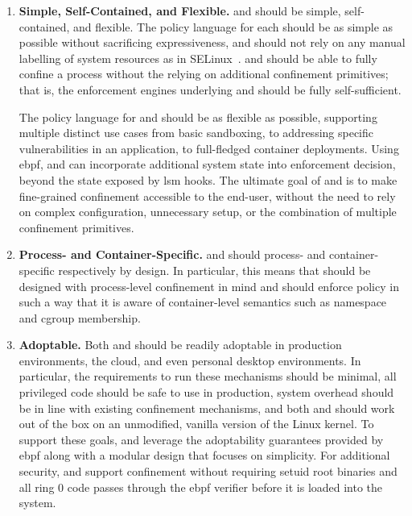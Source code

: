 \begin{enumerate}[font=\bfseries]
  \item \textbf{Simple, Self-Contained, and Flexible.}
    \bpfbox{} and \bpfcontain{} should be simple, self-contained, and flexible.  The
    policy language for each should be as simple as possible without sacrificing
    expressiveness, and should not rely on any manual labelling of system resources as in
    SELinux~\cite{smalley2001_selinux}. \bpfbox{} and \bpfcontain{} should be able to
    fully confine a process without the relying on additional confinement primitives; that
    is, the enforcement engines underlying \bpfbox{} and \bpfcontain{} should be fully
    self-sufficient.

    The policy language for \bpfbox{} and \bpfcontain{} should be as flexible as possible,
    supporting multiple distinct use cases from basic sandboxing, to addressing specific
    vulnerabilities in an application, to full-fledged container deployments. Using
    \gls{ebpf}, \bpfbox{} and \bpfcontain{} can incorporate additional system state into
    enforcement decision, beyond the state exposed by \gls{lsm} hooks. The ultimate goal
    of \bpfbox{} and \bpfcontain{} is to make fine-grained confinement accessible to the
    end-user, without the need to rely on complex configuration, unnecessary setup, or the
    combination of multiple confinement primitives.

  \item \textbf{Process- and Container-Specific.}
    \bpfbox{} and \bpfcontain{} should process- and container-specific respectively by
    design. In particular, this means that \bpfbox{} should be designed with process-level
    confinement in mind and \bpfcontain{} should enforce policy in such a way that it is
    aware of container-level semantics such as namespace and cgroup membership.

  \item \textbf{Adoptable.}
    Both \bpfbox{} and \bpfcontain{} should be readily adoptable in production
    environments, the cloud, and even personal desktop environments. In particular, the
    requirements to run these mechanisms should be minimal, all privileged code should be
    safe to use in production, system overhead should be in line with existing confinement
    mechanisms, and both \bpfbox{} and \bpfcontain{} should work out of the box on an
    unmodified, vanilla version of the Linux kernel. To support these goals, \bpfbox{} and
    \bpfcontain{} leverage the adoptability guarantees provided by \gls{ebpf} along with
    a modular design that focuses on simplicity. For additional security, \bpfbox{} and
    \bpfcontain{} support confinement without requiring setuid root binaries and all ring
    0 code passes through the \gls{ebpf} verifier before it is loaded into the system.
\end{enumerate}





